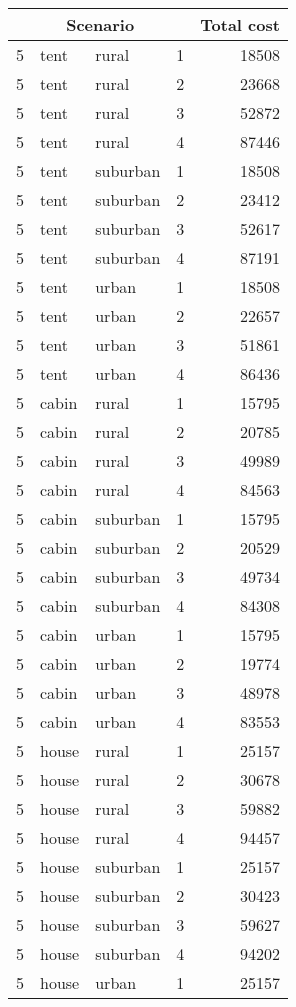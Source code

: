 
\begin{center}
\begin{longtable}{llllr}
\multicolumn{4}{c}{Scenario} & Total cost \\ \hline
5 & tent & rural & 1 & 18508 \\
5 & tent & rural & 2 & 23668 \\
5 & tent & rural & 3 & 52872 \\
5 & tent & rural & 4 & 87446 \\
5 & tent & suburban & 1 & 18508 \\
5 & tent & suburban & 2 & 23412 \\
5 & tent & suburban & 3 & 52617 \\
5 & tent & suburban & 4 & 87191 \\
5 & tent & urban & 1 & 18508 \\
5 & tent & urban & 2 & 22657 \\
5 & tent & urban & 3 & 51861 \\
5 & tent & urban & 4 & 86436 \\
5 & cabin & rural & 1 & 15795 \\
5 & cabin & rural & 2 & 20785 \\
5 & cabin & rural & 3 & 49989 \\
5 & cabin & rural & 4 & 84563 \\
5 & cabin & suburban & 1 & 15795 \\
5 & cabin & suburban & 2 & 20529 \\
5 & cabin & suburban & 3 & 49734 \\
5 & cabin & suburban & 4 & 84308 \\
5 & cabin & urban & 1 & 15795 \\
5 & cabin & urban & 2 & 19774 \\
5 & cabin & urban & 3 & 48978 \\
5 & cabin & urban & 4 & 83553 \\
5 & house & rural & 1 & 25157 \\
5 & house & rural & 2 & 30678 \\
5 & house & rural & 3 & 59882 \\
5 & house & rural & 4 & 94457 \\
5 & house & suburban & 1 & 25157 \\
5 & house & suburban & 2 & 30423 \\
5 & house & suburban & 3 & 59627 \\
5 & house & suburban & 4 & 94202 \\
5 & house & urban & 1 & 25157 \\

\end{longtable}
\end{center}
